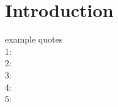 \documentclass[
	a4paper,
	pagesize,
	pdftex,
	12pt,
	ngerman,
	fleqn,
	final,
	]{scrartcl}
\theoremstyle{definition}
\begin{document}

\grad{} %
\makeTitel

\tableofcontents
\newpage
\section{Introduction}
	example quotes\\
	1: \cite{self} \\
	2: \cite{tax2017predictive} \\
	3: \cite{de2018aligning} \\
	4: \cite{lu2014conformance} \\
	5: \cite{lu2014conformanceShort}

\newpage		



\selbstaendigkeitserklaerung{\today}
\end{document}

